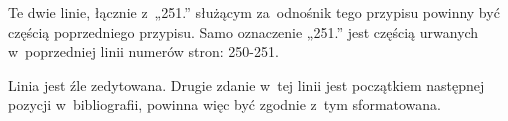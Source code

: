 \documentclass[a4paper,11pt]{article}
\begin{document}
\noindent
{} Te dwie linie, łącznie z~„251.” służącym za~odnośnik tego
przypisu powinny być częścią poprzedniego przypisu. Samo oznaczenie „251.”
jest częścią urwanych w~poprzedniej linii numerów stron: 250-251.

\vspace{\spaceFour}





\noindent
{} Linia jest źle zedytowana. Drugie zdanie w~tej linii jest
początkiem następnej pozycji w~bibliografii, powinna więc być zgodnie z~tym
sformatowana.

\vspace{\spaceFour}





\newpage

\end{document}

